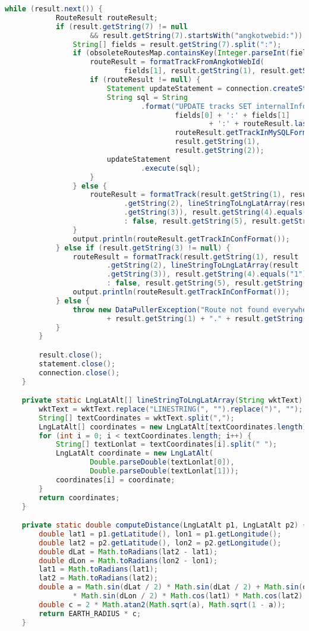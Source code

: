 \begin{lstlisting}[language=Java,basicstyle=\tiny,caption=DataPuller.java]
		while (result.next()) {
			RouteResult routeResult;
			if (result.getString(7) != null
					&& result.getString(7).startsWith("angkotwebid:")) {
				String[] fields = result.getString(7).split(":");
				if (obsoleteRoutesMap.containsKey(Integer.parseInt(fields[1]))) {
					routeResult = formatTrackFromAngkotWebId(
							fields[1], result.getString(1), result.getString(2));
					if (routeResult != null) {
						Statement updateStatement = connection.createStatement();
						String sql = String
								.format("UPDATE tracks SET internalInfo='%s', geodata=%s WHERE trackTypeId='%s' AND trackId='%s'",
										fields[0] + ':' + fields[1]
												+ ':' + routeResult.lastUpdate,
										routeResult.getTrackInMySQLFormat(),
										result.getString(1),
										result.getString(2));
						updateStatement
								.execute(sql);
					}					
				} else {
					routeResult = formatTrack(result.getString(1), result
							.getString(2), lineStringToLngLatArray(result
							.getString(3)), result.getString(4).equals("1") ? true
							: false, result.getString(5), result.getString(6), 0);
				}
				output.println(routeResult.getTrackInConfFormat());
			} else if (result.getString(3) != null) {
				routeResult = formatTrack(result.getString(1), result
						.getString(2), lineStringToLngLatArray(result
						.getString(3)), result.getString(4).equals("1") ? true
						: false, result.getString(5), result.getString(6), 0);
				output.println(routeResult.getTrackInConfFormat());
			} else {
				throw new DataPullerException("Route not found everywhere for "
						+ result.getString(1) + "." + result.getString(2));
			}
		}

		result.close();
		statement.close();
		connection.close();
	}

	private static LngLatAlt[] lineStringToLngLatArray(String wktText) {
		wktText = wktText.replace("LINESTRING(", "").replace(")", "");
		String[] textCoordinates = wktText.split(",");
		LngLatAlt[] coordinates = new LngLatAlt[textCoordinates.length];
		for (int i = 0; i < textCoordinates.length; i++) {
			String[] textLonlat = textCoordinates[i].split(" ");
			LngLatAlt coordinate = new LngLatAlt(
					Double.parseDouble(textLonlat[0]),
					Double.parseDouble(textLonlat[1]));
			coordinates[i] = coordinate;
		}
		return coordinates;
	}

	private static double computeDistance(LngLatAlt p1, LngLatAlt p2) {
		double lat1 = p1.getLatitude(), lon1 = p1.getLongitude();
		double lat2 = p2.getLatitude(), lon2 = p2.getLongitude();
		double dLat = Math.toRadians(lat2 - lat1);
		double dLon = Math.toRadians(lon2 - lon1);
		lat1 = Math.toRadians(lat1);
		lat2 = Math.toRadians(lat2);
		double a = Math.sin(dLat / 2) * Math.sin(dLat / 2) + Math.sin(dLon / 2)
				* Math.sin(dLon / 2) * Math.cos(lat1) * Math.cos(lat2);
		double c = 2 * Math.atan2(Math.sqrt(a), Math.sqrt(1 - a));
		return EARTH_RADIUS * c;
	}


\end{lstlisting}
